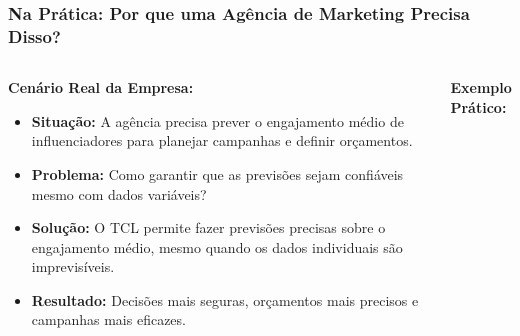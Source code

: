 \documentclass[aspectratio=169,12pt]{beamer}
\begin{document}
\begin{frame}
    \frametitle{Na Prática: Por que uma Agência de Marketing Precisa Disso?}
    
    \begin{columns}
        \begin{column}{0.6\textwidth}
            \textbf{\Large Cenário Real da Empresa:}
            \vspace{0.5cm}
            
            \begin{itemize}
                \item[\faIcon{building}] \textcolor{azulprincipal}{\textbf{Situação:}} A agência precisa prever o engajamento médio de influenciadores para planejar campanhas e definir orçamentos.
                \vspace{0.3cm}
                
                \item[\faIcon{question-circle}] \textcolor{azulprincipal}{\textbf{Problema:}} Como garantir que as previsões sejam confiáveis mesmo com dados variáveis?
                \vspace{0.3cm}
                
                \item[\faIcon{lightbulb}] \textcolor{azulprincipal}{\textbf{Solução:}} O TCL permite fazer previsões precisas sobre o engajamento médio, mesmo quando os dados individuais são imprevisíveis.
                \vspace{0.3cm}
                
                \item[\faIcon{chart-line}] \textcolor{azulprincipal}{\textbf{Resultado:}} Decisões mais seguras, orçamentos mais precisos e campanhas mais eficazes.
            \end{itemize}
        \end{column}
        
        \begin{column}{0.4\textwidth}
            \begin{center}
                \textbf{\large Exemplo Prático:}
                \vspace{0.3cm}
                
\end{center}
\end{column}
\end{columns}
\end{frame}
\end{document}
